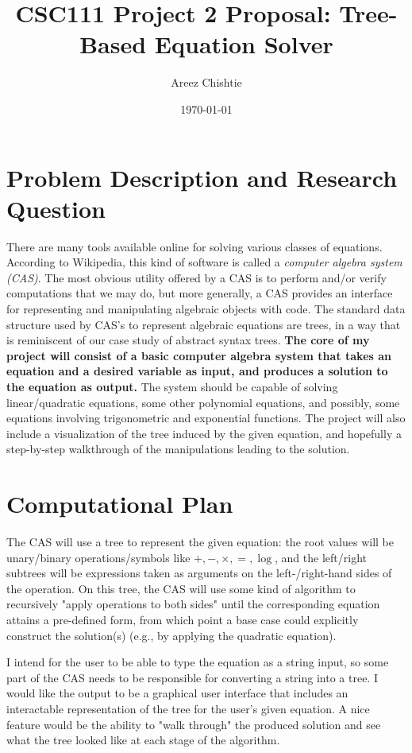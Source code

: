 \documentclass[11pt]{article}
\title{CSC111 Project 2 Proposal: Tree-Based Equation Solver}
\author{Areez Chishtie}
\date{\today}
\begin{document}
\maketitle

\section*{Problem Description and Research Question}

There are many tools available online for solving various classes of equations. According to Wikipedia, this kind of software is called a \textit{computer algebra system (CAS)}. The most obvious utility offered by a CAS is to perform and/or verify computations that we may do, but more generally, a CAS provides an interface for representing and manipulating algebraic objects with code. The standard data structure used by CAS's to represent algebraic equations are trees, in a way that is reminiscent of our case study of abstract syntax trees. \textbf{The core of my project will consist of a basic computer algebra system that takes an equation and a desired variable as input, and produces a solution to the equation as output.} The system should be capable of solving linear/quadratic equations, some other polynomial equations, and possibly, some equations involving trigonometric and exponential functions. The project will also include a visualization of the tree induced by the given equation, and hopefully a step-by-step walkthrough of the manipulations leading to the solution.

\section*{Computational Plan}

The CAS will use a tree to represent the given equation: the root values will be unary/binary operations/symbols like $+, -, \times, =, \log$, and the left/right subtrees will be expressions taken as arguments on the left-/right-hand sides of the operation. On this tree, the CAS will use some kind of algorithm to recursively "apply operations to both sides" until the corresponding equation attains a pre-defined form, from which point a base case could explicitly construct the solution(s) (e.g., by applying the quadratic equation).

I intend for the user to be able to type the equation as a string input, so some part of the CAS needs to be responsible for converting a string into a tree. I would like the output to be a graphical user interface that includes an interactable representation of the tree for the user's given equation. A nice feature would be the ability to "walk through" the produced solution and see what the tree looked like at each stage of the algorithm.
\end{document}

